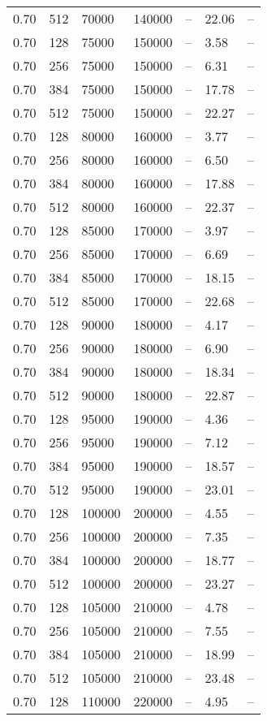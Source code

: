 \begin{tabular}{l|l|l|l|l|l|l}
0.70 & 512 &  70000 & 140000 & -- & 22.06 & --\\
0.70 & 128 &  75000 & 150000 & -- &  3.58 & --\\
0.70 & 256 &  75000 & 150000 & -- &  6.31 & --\\
0.70 & 384 &  75000 & 150000 & -- & 17.78 & --\\
0.70 & 512 &  75000 & 150000 & -- & 22.27 & --\\
0.70 & 128 &  80000 & 160000 & -- &  3.77 & --\\
0.70 & 256 &  80000 & 160000 & -- &  6.50 & --\\
0.70 & 384 &  80000 & 160000 & -- & 17.88 & --\\
0.70 & 512 &  80000 & 160000 & -- & 22.37 & --\\
0.70 & 128 &  85000 & 170000 & -- &  3.97 & --\\
0.70 & 256 &  85000 & 170000 & -- &  6.69 & --\\
0.70 & 384 &  85000 & 170000 & -- & 18.15 & --\\
0.70 & 512 &  85000 & 170000 & -- & 22.68 & --\\
0.70 & 128 &  90000 & 180000 & -- &  4.17 & --\\
0.70 & 256 &  90000 & 180000 & -- &  6.90 & --\\
0.70 & 384 &  90000 & 180000 & -- & 18.34 & --\\
0.70 & 512 &  90000 & 180000 & -- & 22.87 & --\\
0.70 & 128 &  95000 & 190000 & -- &  4.36 & --\\
0.70 & 256 &  95000 & 190000 & -- &  7.12 & --\\
0.70 & 384 &  95000 & 190000 & -- & 18.57 & --\\
0.70 & 512 &  95000 & 190000 & -- & 23.01 & --\\
0.70 & 128 & 100000 & 200000 & -- &  4.55 & --\\
0.70 & 256 & 100000 & 200000 & -- &  7.35 & --\\
0.70 & 384 & 100000 & 200000 & -- & 18.77 & --\\
0.70 & 512 & 100000 & 200000 & -- & 23.27 & --\\
0.70 & 128 & 105000 & 210000 & -- &  4.78 & --\\
0.70 & 256 & 105000 & 210000 & -- &  7.55 & --\\
0.70 & 384 & 105000 & 210000 & -- & 18.99 & --\\
0.70 & 512 & 105000 & 210000 & -- & 23.48 & --\\
0.70 & 128 & 110000 & 220000 & -- &  4.95 & --\\

\end{tabular}
